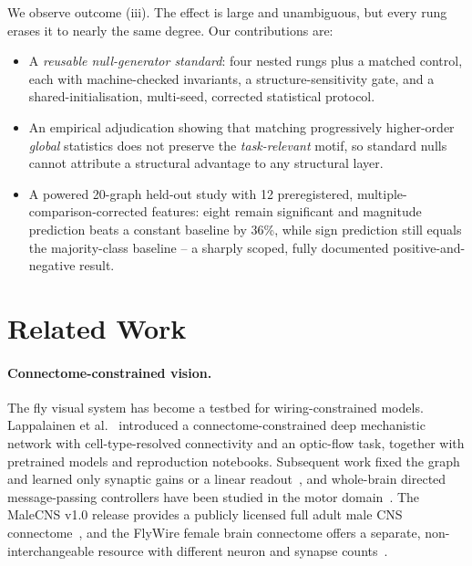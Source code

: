 \documentclass[10pt,twocolumn,letterpaper]{article}
\begin{document}
We observe outcome (iii). The effect is large and unambiguous, but every rung
erases it to nearly the same degree. Our contributions are:

\begin{itemize}
\item A \emph{reusable null-generator standard}: four nested rungs plus a
  matched control, each with machine-checked invariants, a structure-sensitivity
  gate, and a shared-initialisation, multi-seed, corrected statistical protocol.
\item An empirical adjudication showing that matching progressively
  higher-order \emph{global} statistics does not preserve the
  \emph{task-relevant} motif, so standard nulls cannot attribute a structural
  advantage to any structural layer.
\item A powered 20-graph held-out study with 12 preregistered,
  multiple-comparison-corrected features: eight remain significant and
  magnitude prediction beats a constant baseline by 36\%, while sign
  prediction still equals the majority-class baseline -- a sharply scoped,
  fully documented positive-and-negative result.
\end{itemize}

\section{Related Work}
\label{sec:related}

\paragraph{Connectome-constrained vision.}
The fly visual system has become a testbed for wiring-constrained models.
Lappalainen et al.~\cite{lappalainen2024} introduced a connectome-constrained
deep mechanistic network with cell-type-resolved connectivity and an
optic-flow task, together with pretrained models and reproduction notebooks.
Subsequent work fixed the graph and learned only synaptic gains or a linear
readout~\cite{structurealone2026}, and whole-brain
directed message-passing controllers have been studied in the motor
domain~\cite{flygm2026}. The MaleCNS v1.0 release provides a publicly
licensed full adult male CNS connectome~\cite{malecns2026}, and the FlyWire
female brain connectome offers a separate, non-interchangeable resource
with different neuron and synapse counts~\cite{dorkenwald2024}.
\end{document}
